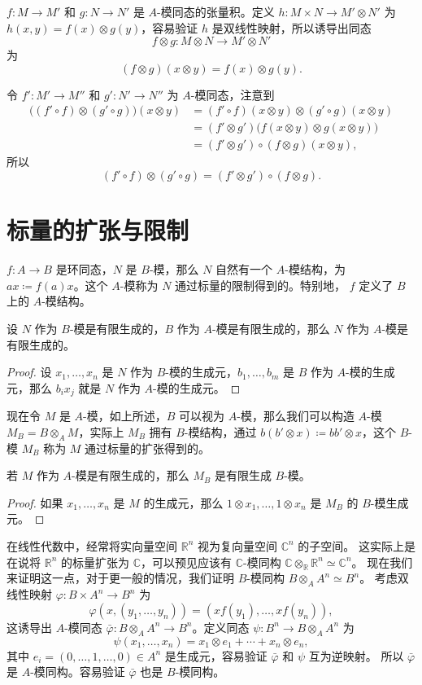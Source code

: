$f:M\to M'$ 和 $g:N\to N'$ 是 $A$-模同态的张量积。定义 $h:M\times N\to M'\otimes N'$ 为
$h(x,y)=f(x)\otimes g(y)$，容易验证 $h$ 是双线性映射，所以诱导出同态
\[
  f\otimes g:M\otimes N\to M'\otimes N'  
\]
为
\[
  (f\otimes g)(x\otimes y)=f(x)\otimes g(y).  
\]

令 $f':M'\to M''$ 和 $g':N'\to N''$ 为 $A$-模同态，注意到
\begin{align*}
  \bigl((f'\circ f)\otimes (g'\circ g)\bigr)(x\otimes y)
  &=(f'\circ f)(x\otimes y)\otimes  (g'\circ g)(x\otimes y)\\
  &=(f'\otimes g')\bigl(f(x\otimes y)\otimes g(x\otimes y)\bigr) \\
  &=(f'\otimes g')\circ (f\otimes g)(x\otimes y),
\end{align*}
所以
\[
  (f'\circ f)\otimes (g'\circ g)=(f'\otimes g')\circ (f\otimes g).  
\]

\section{标量的扩张与限制}

$f:A\to B$ 是环同态，$N$ 是 $B$-模，那么 $N$ 自然有一个 $A$-模结构，为
$ax\coloneqq f(a)x$。这个 $A$-模称为 $N$ 通过标量的限制得到的。特别地，
$f$ 定义了 $B$ 上的 $A$-模结构。

\begin{proposition}
  设 $N$ 作为 $B$-模是有限生成的，$B$ 作为 $A$-模是有限生成的，那么 $N$
  作为 $A$-模是有限生成的。
\end{proposition}
\begin{proof}
  设 $x_1,\dots,x_n$ 是 $N$ 作为 $B$-模的生成元，$b_1,\dots,b_m$ 是 $B$
  作为 $A$-模的生成元，那么 $b_ix_j$ 就是 $N$ 作为 $A$-模的生成元。
\end{proof}

现在令 $M$ 是 $A$-模，如上所述，$B$ 可以视为 $A$-模，那么我们可以构造
$A$-模 $M_B=B\otimes_A M$，实际上 $M_B$ 拥有 $B$-模结构，通过
$b(b'\otimes x)\coloneqq bb'\otimes x$，这个 $B$-模 $M_B$
称为 $M$ 通过标量的扩张得到的。

\begin{proposition}
  若 $M$ 作为 $A$-模是有限生成的，那么 $M_B$ 是有限生成 $B$-模。
\end{proposition}
\begin{proof}
  如果 $x_1,\dots,x_n$ 是 $M$ 的生成元，那么
  $1\otimes x_1,\dots,1\otimes x_n$ 是 $M_B$ 的 $B$-模生成元。
\end{proof}

在线性代数中，经常将实向量空间 $\mathbb{R}^n$ 视为复向量空间 $\mathbb{C}^n$ 的子空间。
这实际上是在说将 $\mathbb{R}^n$ 的标量扩张为 $\mathbb{C}$，可以预见应该有
$\mathbb{C}$-模同构 $\mathbb{C}\otimes_{\mathbb{R}}\mathbb{R}^n\simeq\mathbb{C}^n$。
现在我们来证明这一点，对于更一般的情况，我们证明 $B$-模同构 $B\otimes_A A^n\simeq B^n$。
考虑双线性映射 $\varphi:B\times A^n\to B^n$ 为
\[
  \varphi(x,(y_1,\dots,y_n))  =(xf(y_1),\dots,xf(y_n)),
\]
这诱导出 $A$-模同态 $\bar\varphi:B\otimes_A A^n\to B^n$。定义同态 $\psi:B^n\to B\otimes_A A^n$
为
\[
  \psi(x_1,\dots,x_n)=x_1\otimes e_1+\cdots+x_n\otimes e_n,  
\]
其中 $e_i=(0,\dots,1,\dots,0)\in A^n$ 是生成元，容易验证 $\bar\varphi$ 和 $\psi$ 互为逆映射。
所以 $\bar\varphi$ 是 $A$-模同构。容易验证 $\bar\varphi$ 也是 $B$-模同构。

